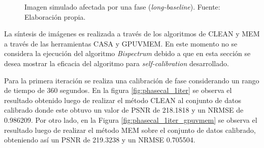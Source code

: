 \begin{figure}[!ht]
 \centering
 \caption[Imagen simulado afectada por una fase (\textit{long-baseline})]{Imagen simulado afectada por una fase (\textit{long-baseline}). Fuente: Elaboración propia.}
 \label{fig:noisy_image}
\end{figure}

La síntesis de imágenes es realizada a través de los algoritmos de CLEAN y MEM a través de las herramientas CASA y GPUVMEM. En este momento no se considera la ejecución del algoritmo \textit{Bispectrum} debido a que en esta sección se desea mostrar la eficacia del algoritmo para \textit{self-calibration} desarrollado. 

Para la primera iteración se realiza una calibración de fase considerando un rango de tiempo de 360 segundos. En la figura \ref{fig:phasecal_1iter} se observa el resultado obtenido luego de realizar el método CLEAN al conjunto de datos calibrado donde este obtuvo un valor de PSNR de 218.1818 y un NRMSE de 0.986209. Por otro lado, en la Figura \ref{fig:phasecal_1iter_gpuvmem} se observa el resultado luego de realizar el método MEM sobre el conjunto de datos calibrado, obteniendo así un PSNR de 219.3238 y un NRMSE 0.705504.

